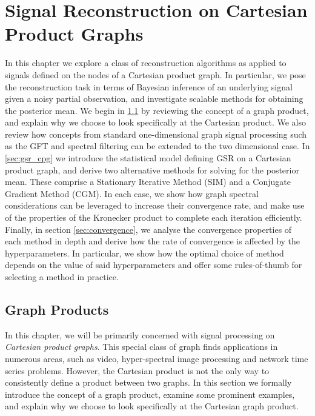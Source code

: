 \chapter{Signal Reconstruction on Cartesian Product Graphs}

\label{chap:reg_and_rec}



In this chapter we explore a class of reconstruction algorithms as applied to signals defined on the nodes of a Cartesian product graph. In particular, we pose the reconstruction task in terms of Bayesian inference of an underlying signal given a noisy partial observation, and investigate scalable methods for obtaining the posterior mean. We begin in \cref{sec:reg_and_rec_intro} by reviewing the concept of a graph product, and explain why we choose to look specifically at the Cartesian product. We also review how concepts from standard one-dimensional graph signal processing such as the GFT and spectral filtering can be extended to the two dimensional case. In \cref{sec:gsr_cpg} we introduce the statistical model defining GSR on a Cartesian product graph, and derive two alternative methods for solving for the posterior mean. These comprise a Stationary Iterative Method (SIM) and a Conjugate Gradient Method (CGM). In each case, we show how graph spectral considerations can be leveraged to increase their convergence rate, and make use of the properties of the Kronecker product to complete each iteration efficiently. Finally, in section \ref{sec:convergence}, we analyse the convergence properties of each method in depth and derive how the rate of convergence is affected by the hyperparameters. In particular, we show how the optimal choice of method depends on the value of said hyperparameters and offer some rules-of-thumb for selecting a method in practice. 




\section{Graph Products}

\label{sec:reg_and_rec_intro}

In this chapter, we will be primarily concerned with signal processing on \textit{Cartesian product graphs}. This special class of graph finds applications in numerous areas, such as video, hyper-spectral image processing and network time series problems. However, the Cartesian product is not the only way to consistently define a product between two graphs. In this section we formally introduce the concept of a graph product, examine  some prominent examples, and explain why we choose to look specifically at the Cartesian graph product.


